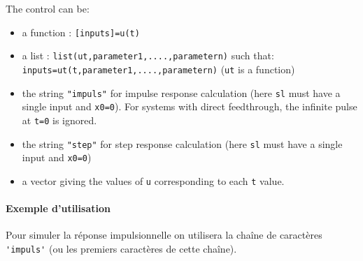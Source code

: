\begin{doc}
\begin{itemize}
    The control can be:
    \begin{itemize}
        \item a function : \verb?[inputs]=u(t)?
        \item a list : \verb?list(ut,parameter1,....,parametern)? such that:
              \verb?inputs=ut(t,parameter1,....,parametern)? 
    (\verb?ut? is a function)
        \item the string \verb?"impuls"? for impulse response calculation 
              (here \verb?sl? must have a single input and \verb?x0=0?). 
              For systems with direct feedthrough, the infinite pulse at 
              \verb?t=0? is ignored.
        \item the string \verb?"step"? for step response calculation (here 
              \verb?sl? must have a single input and \verb?x0=0?)
        \item a vector giving the values of \verb?u? corresponding to each 
              \verb?t? value.
\end{itemize}
\end{itemize}
\end{doc}

\paragraph{Exemple d'utilisation}

Pour simuler la réponse impulsionnelle on utilisera la chaîne de caractères 
\verb?'impuls'? (ou les premiers caractères de cette chaîne). 


